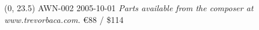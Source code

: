 \documentclass[10pt]{article}
\begin{document}
\begin{textblock}{23}(0, 23.5)
AWN-002 2005-10-01
\hfill \textit{Parts available from the composer at www.trevorbaca.com.}
\hfill \euro 88 / \$114
\end{textblock}
\end{document}
